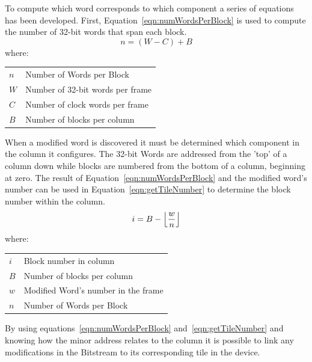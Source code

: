 \documentclass[conference]{IEEEtran}
\makeatletter
\newcommand{\ConditionSize}{\footnotesize}
\DeclarePairedDelimiter\floor{\lfloor}{\rfloor}
\newenvironment{conditions}
{\par\vspace{\abovedisplayskip}\noindent\begin{tabular}{>{$}l<{$} @{${}={}$} l}}
	{\end{tabular}\par\vspace{\belowdisplayskip}}
\makeatother
\begin{document}
To compute which word corresponds to which component a series of equations has been developed.
First, Equation~\ref{eqn:numWordsPerBlock} is used to compute the number of 32-bit words that span each block.
\begin{equation} \label{eqn:numWordsPerBlock}
n = (W - C) + B
\end{equation}
where:
\begin{conditions}
	n     &  Number of Words per Block \\
	W     &  Number of 32-bit words per frame \\   
	C     &  Number of clock words per frame \\
	B     &  Number of blocks per column
\end{conditions}
When a modified word is discovered it must be determined which component in the column it configures.
The 32-bit Words are addressed from the 'top' of a column down while blocks are numbered from the bottom of a column, beginning at zero.
The result of Equation~\ref{eqn:numWordsPerBlock} and the modified word's number can be used in Equation~\ref{eqn:getTileNumber} to determine the block number within the column.
\begin{equation} \label{eqn:getTileNumber}
i = B - \floor*{\frac{w}{n}}
\end{equation}
where:
\begin{conditions}
	i     &  Block number in column\\
	B     &  Number of blocks per column \\
	w     &  Modified Word's number in the frame\\
	n     &  Number of Words per Block 
\end{conditions}
By using equations~\ref{eqn:numWordsPerBlock} and~\ref{eqn:getTileNumber} and knowing how the minor address relates to the column it is possible to link any modifications in the \gls{Bitstream} to its corresponding tile in the device.

\end{document}
